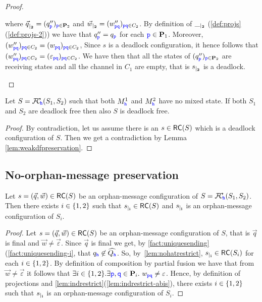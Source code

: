 \begin{proof}
\begin{description}
\begin{description}
where ${\vec{q}}_{\mid_{\mathbf{2}}} = (q''_{\mathtt{\color{blue}{ {p}}}})_{{\mathtt{\color{blue}{ {p}}}}\in\mathbf{P}_2}$
and ${\vec{w}}_{\mid_{\mathbf{2}}} = (w''_{{\mathtt{\color{blue}{ {p}}}}{\mathtt{\color{blue}{ {q}}}}})_{{\mathtt{\color{blue}{ {p}}}}{\mathtt{\color{blue}{ {q}}}}\in C_2}$.
By definition of ${\_}_{\mid_{\mathbf{2}}}$ (\cref{def:projs}(\ref{def:projs-2}))
we have that $q''_{\mathtt{\color{blue}{ {p}}}} = q_{\mathtt{\color{blue}{ {p}}}}$ for each ${\mathtt{\color{blue}{ {p}}}}\in\mathbf{P}_1$.
Moreover, $(w''_{{\mathtt{\color{blue}{ {p}}}}{\mathtt{\color{blue}{ {q}}}}})_{{\mathtt{\color{blue}{ {p}}}}{\mathtt{\color{blue}{ {q}}}}\in C_2} =  (w_{{\mathtt{\color{blue}{ {p}}}}{\mathtt{\color{blue}{ {q}}}}})_{{\mathtt{\color{blue}{ {p}}}}{\mathtt{\color{blue}{ {q}}}}\in C_2}$,
Since $s$ is a deadlock configuration, it hence follows that  $(w''_{{\mathtt{\color{blue}{ {p}}}}{\mathtt{\color{blue}{ {q}}}}})_{{\mathtt{\color{blue}{ {p}}}}{\mathtt{\color{blue}{ {q}}}}\in C_2} =  (\varepsilon_{{\mathtt{\color{blue}{ {p}}}}{\mathtt{\color{blue}{ {q}}}}})_{{\mathtt{\color{blue}{ {p}}}}{\mathtt{\color{blue}{ {q}}}}\in C_2}$.
We have then that all the states of $(q''_{\mathtt{\color{blue}{ {p}}}})_{{\mathtt{\color{blue}{ {p}}}}\in\mathbf{P}_2}$ are receiving states
and all the channel in $C_1$ are empty, that is ${s}_{\mid_{\mathbf{2}}}$ is a deadlock.
\end{description}
 \end{description}
 \end{proof}

\begin{corollary}%
\label{prop:weakdfPreservation}
Let $S = {\mathcal{F}\!\mathcal{C}}_{\!{\mathtt{\color{blue}{ {h}}}}}(S_1,S_2)$ such that
both $M^1_{\mathtt{\color{blue}{ {h}}}}$ and $M^2_{\mathtt{\color{blue}{ {h}}}}$ have no mixed state.
If both $S_1$ and $S_2$ are deadlock free then also $S$ is deadlock free.
\end{corollary}
\begin{proof}
By contradiction, let us assume there is an $s\in \mathsf{RC}(S)$ which is a deadlock configuration of $S$. Then we get a contradiction by Lemma \ref{lem:weakdfpreservation}.
\end{proof}



\subsection{No-orphan-message preservation}


\begin{lemma}%
\label{lem:restrRSom}
Let $s= (\vec{q},\vec{w}) \in \mathsf{RC}(S)$ be an orphan-message configuration of $S={\mathcal{F}\!\mathcal{C}}_{\!{\mathtt{\color{blue}{ {h}}}}}(S_1,S_2)$.
Then there exists $i\in \{1,2\}$ such that ${s}_{\mid_{\mathbf{i}}}\in \mathsf{RC}(S)$ and ${s}_{\mid_{\mathbf{i}}}$ is an  orphan-message configuration of $S_i$.
\end{lemma}

\begin{proof}
Let $s= (\vec{q},\vec{w}) \in \mathsf{RC}(S)$ be an orphan-message configuration of $S$, 
that is $\vec{q}$ is final and $\vec{w}\neq \vec{\varepsilon}$.
Since $\vec{q}$ is final we get, by  \cref{fact:uniquesending}(\ref{fact:uniquesending-i},  
that $q_{{\mathtt{\color{blue}{ {h}}}}}\not\in \widehat{Q_{{\mathtt{\color{blue}{ {h}}}}}}$.
So, by~\cref{lem:nohatrestrict}, ${s}_{\mid_{\mathbf{i}}}\in \mathsf{RC}(S_i)$ for each $i\in \{1,2\}$. 
By definition of composition by partial fusion we have that from $\vec{w}\neq \vec{\varepsilon}$
it follows that $\exists i\in \Set{1,2}.\exists \ttp,\ttq\in \roles_i.\ w_{\ttp\ttq}\neq\varepsilon$.
Hence, by definition of projections and \cref{lem:indrestrict}(\ref{lem:indrestrict-abis}),
there exists  $i\in \{1,2\}$ such that
${s}_{\mid_{\mathbf{i}}}$ is an  orphan-message configuration of $S_i$.
\end{proof}



